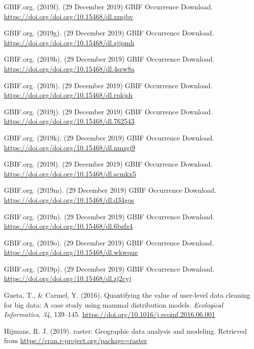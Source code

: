 \documentclass[
  12pt,
]{article}
\begin{document}
\leavevmode\hypertarget{ref-GBIForg2019e}{}%
GBIF.org. (2019f). (29 December 2019) GBIF Occurrence Download. \url{https://doi.org/doi.org/10.15468/dl.zznjbv}

\leavevmode\hypertarget{ref-GBIForg2019f}{}%
GBIF.org. (2019g). (29 December 2019) GBIF Occurrence Download. \url{https://doi.org/doi.org/10.15468/dl.zjjpmh}

\leavevmode\hypertarget{ref-GBIForg2019g}{}%
GBIF.org. (2019h). (29 December 2019) GBIF Occurrence Download. \url{https://doi.org/doi.org/10.15468/dl.4srw8a}

\leavevmode\hypertarget{ref-GBIForg2019h}{}%
GBIF.org. (2019i). (29 December 2019) GBIF Occurrence Download. \url{https://doi.org/doi.org/10.15468/dl.rpkjsh}

\leavevmode\hypertarget{ref-GBIForg2019i}{}%
GBIF.org. (2019j). (29 December 2019) GBIF Occurrence Download. \url{https://doi.org/doi.org/10.15468/dl.762543}

\leavevmode\hypertarget{ref-GBIForg2019j}{}%
GBIF.org. (2019k). (29 December 2019) GBIF Occurrence Download. \url{https://doi.org/doi.org/10.15468/dl.nmzgi9}

\leavevmode\hypertarget{ref-GBIForg2019k}{}%
GBIF.org. (2019l). (29 December 2019) GBIF Occurrence Download. \url{https://doi.org/doi.org/10.15468/dl.scmkx5}

\leavevmode\hypertarget{ref-GBIForg2019l}{}%
GBIF.org. (2019m). (29 December 2019) GBIF Occurrence Download. \url{https://doi.org/doi.org/10.15468/dl.d34gos}

\leavevmode\hypertarget{ref-GBIForg2019m}{}%
GBIF.org. (2019n). (29 December 2019) GBIF Occurrence Download. \url{https://doi.org/doi.org/10.15468/dl.6bzfz4}

\leavevmode\hypertarget{ref-GBIForg2019n}{}%
GBIF.org. (2019o). (29 December 2019) GBIF Occurrence Download. \url{https://doi.org/doi.org/10.15468/dl.wkwque}

\leavevmode\hypertarget{ref-GBIForg2019o}{}%
GBIF.org. (2019p). (29 December 2019) GBIF Occurrence Download. \url{https://doi.org/doi.org/10.15468/dl.zj2cyj}

\leavevmode\hypertarget{ref-Gueta2016}{}%
Gueta, T., \& Carmel, Y. (2016). Quantifying the value of user-level data cleaning for big data: A case study using mammal distribution models. \emph{Ecological Informatics}, \emph{34}, 139--145. \url{https://doi.org/10.1016/j.ecoinf.2016.06.001}

\leavevmode\hypertarget{ref-Hijmans2019}{}%
Hijmans, R. J. (2019). raster: Geographic data analysis and modeling. Retrieved from \url{https://cran.r-project.org/package=raster}
\end{document}
